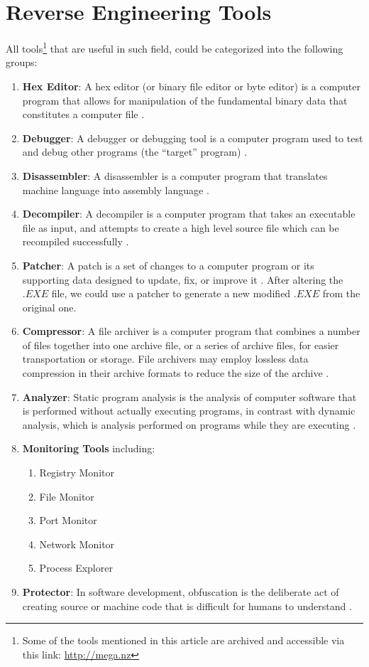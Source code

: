 \documentclass[twocolumn]{article}
\begin{document}
\section{Reverse Engineering Tools}
All tools\footnote{Some of the tools mentioned in this article are archived and
accessible via this link: \url{http://mega.nz}}
that are useful in such field, could be categorized into the following
groups:
\begin{enumerate}
\item \textbf{Hex Editor}: A hex editor (or binary file editor or byte editor)
is a computer program that allows for manipulation of the fundamental binary
data that constitutes a computer file \cite{WEBSITE:3}.
\item \textbf{Debugger}: A debugger or debugging tool is a computer program used
to test and debug other programs (the ``target'' program) \cite{WEBSITE:4}.
\item \textbf{Disassembler}: A disassembler is a computer program that
translates machine language into assembly language \cite{WEBSITE:5}.
\item \textbf{Decompiler}: A decompiler is a computer program that takes an
executable file as input, and attempts to create a high level source file which
can be recompiled successfully \cite{WEBSITE:6}.
\item \textbf{Patcher}: A patch is a set of changes to a computer program or its
supporting data designed to update, fix, or improve it \cite{WEBSITE:7}. After
altering the $.EXE$ file, we could use a patcher to generate a new modified
$.EXE$ from the original one.
\item \textbf{Compressor}: A file archiver is a computer program that combines a
number of files together into one archive file, or a series of archive files,
for easier transportation or storage. File archivers may employ lossless data
compression in their archive formats to reduce the size of the archive
\cite{WEBSITE:8}.
\item \textbf{Analyzer}: Static program analysis is the analysis of computer
software that is performed without actually executing programs, in contrast with
dynamic analysis, which is analysis performed on programs while they are
executing \cite{WEBSITE:9}.
\item \textbf{Monitoring Tools} including:
	\begin{enumerate}
	\item Registry Monitor
	\item File Monitor
	\item Port Monitor
	\item Network Monitor
	\item Process Explorer
	\end{enumerate}
\item \textbf{Protector}: In software development, obfuscation is the deliberate
act of creating source or machine code that is difficult for humans to
understand \cite{WEBSITE:10}.
\end{enumerate}
\end{document}
